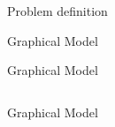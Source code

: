 \begin{frame}{Problem definition}
  \vspace{-0.5cm}
  \scriptsize{
  }
\end{frame}
\begin{frame}{Graphical Model}
  \vspace*{-.5cm}
  \begin{center}
      \newcommand{\imagewidth}{0.9\textwidth}
      
  \end{center}
\end{frame}

\begin{frame}{Graphical Model}
  \begin{columns}
  \hskip-2cm
    \begin{column}[t]{0.9\textwidth}
      \tikzset{/tikz/x=0.9cm,/tikz/y=0.9cm}
      
    \end{column}
    \hspace{-2cm}
    \begin{column}[t]{0.4\textwidth}
      \vspace{-5cm}
      \scalebox{0.45}{
        \newcommand{\imagewidth}{2.125\textwidth}
        
      }
    \end{column}
  \end{columns}
\end{frame}

\begin{frame}{Graphical Model}
  \begin{columns}
  \hskip-2cm
    \begin{column}[c]{0.7\textwidth}
        \tikzset{/tikz/x=0.7cm,/tikz/y=0.7cm}
        \scriptsize{
          
        }
    \end{column}
    \hspace{-1.5cm}
    \vrule{}
    \begin{column}[c]{0.6\textwidth}
      \vspace{-1cm}
      \begin{center}
        \scalebox{0.45}{
          \newcommand{\imagewidth}{2.125\textwidth}
          
        }
      \end{center}
      \tikzset{/tikz/x=0.8cm,/tikz/y=0.8cm}
      
      \end{column}
  \end{columns}
\end{frame}

